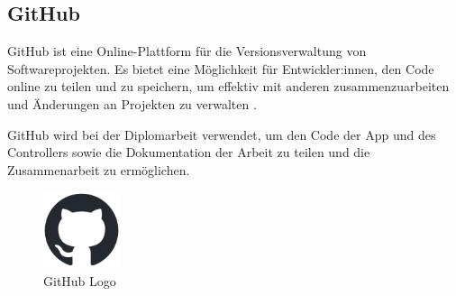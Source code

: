 \subsection{GitHub}
\label{sec:github}

GitHub ist eine Online-Plattform für die Versionsverwaltung von Softwareprojekten. Es bietet eine Möglichkeit für Entwickler:innen, den Code online zu teilen und zu speichern, um effektiv mit anderen zusammenzuarbeiten und Änderungen an Projekten zu verwalten .

\noindent GitHub wird bei der Diplomarbeit verwendet, um den Code der App und des Controllers sowie die Dokumentation der Arbeit zu teilen und die Zusammenarbeit zu ermöglichen.

\begin{figure}[H]
    \centering
    \includegraphics[width=0.2\textwidth]{images/github-mark.png}
    \caption{GitHub Logo }
    \label{fig:githublogo}
\end{figure}